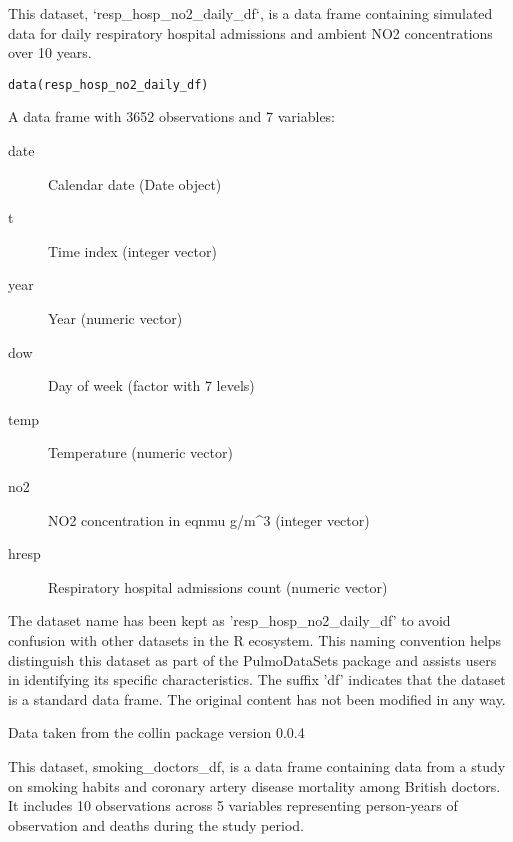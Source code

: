 \documentclass[a4paper]{book}
\begin{document}
%
\begin{Description}
This dataset, `resp\_hosp\_no2\_daily\_df`, is a data frame containing simulated data
for daily respiratory hospital admissions and ambient NO2 concentrations over 10 years.
\end{Description}
%
\begin{Usage}
\begin{verbatim}
data(resp_hosp_no2_daily_df)
\end{verbatim}
\end{Usage}
%
\begin{Format}
A data frame with 3652 observations and 7 variables:
\begin{description}

\item[date] Calendar date (Date object)
\item[t] Time index (integer vector)
\item[year] Year (numeric vector)
\item[dow] Day of week (factor with 7 levels)
\item[temp] Temperature (numeric vector)
\item[no2] NO2 concentration in \bsl{}eqn\bsl{}mu g/m\textasciicircum{}3 (integer vector)
\item[hresp] Respiratory hospital admissions count (numeric vector)

\end{description}

\end{Format}
%
\begin{Details}
The dataset name has been kept as 'resp\_hosp\_no2\_daily\_df' to avoid confusion with other datasets
in the R ecosystem. This naming convention helps distinguish this dataset as part of the
PulmoDataSets package and assists users in identifying its specific characteristics.
The suffix 'df' indicates that the dataset is a standard data frame. The original content has not been modified
in any way.
\end{Details}
%
\begin{Source}
Data taken from the collin package version 0.0.4
\end{Source}
%
\begin{Description}
This dataset, smoking\_doctors\_df, is a data frame containing data from a study
on smoking habits and coronary artery disease mortality among British doctors.
It includes 10 observations across 5 variables representing person-years of
observation and deaths during the study period.
\end{Description}
\end{document}
